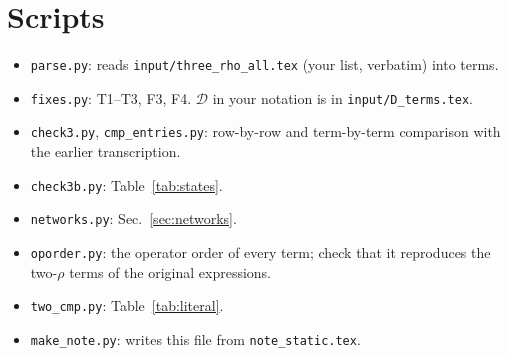 \documentclass[10pt]{article}
\numberwithin{equation}{section}
\begin{document}
\section{Scripts}
\begin{itemize}
\item \texttt{parse.py}: reads \texttt{input/three\_rho\_all.tex} (your list, verbatim) into terms.
\item \texttt{fixes.py}: T1--T3, F3, F4. $\mathcal D$ in your notation is in \texttt{input/D\_terms.tex}.
\item \texttt{check3.py}, \texttt{cmp\_entries.py}: row-by-row and term-by-term comparison with the earlier transcription.
\item \texttt{check3b.py}: Table~\ref{tab:states}.
\item \texttt{networks.py}: Sec.~\ref{sec:networks}.
\item \texttt{oporder.py}: the operator order of every term; check that it reproduces the two-$\rho$ terms of the original expressions.
\item \texttt{two\_cmp.py}: Table~\ref{tab:literal}.
\item \texttt{make\_note.py}: writes this file from \texttt{note\_static.tex}.
\end{itemize}
\end{document}
